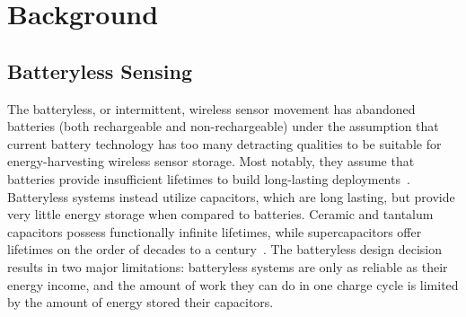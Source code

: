 \chapter{Background}


\section{Batteryless Sensing}

The batteryless, or intermittent, wireless sensor movement has abandoned batteries (both rechargeable and non-rechargeable) under the assumption that current battery technology has too many detracting qualities to be suitable for energy-harvesting wireless sensor storage.
Most notably, they assume that batteries provide insufficient lifetimes to build long-lasting deployments~\cite{hesterNew17, hesterTragedy15, hesterFlicker17, hesterTimely17, hester2017future, colinReconfigurable18, luciaIntermittent17, yervaGrafting12, majid2020continuous}.
Batteryless systems instead utilize capacitors, which are long lasting, but provide very little energy storage when compared to batteries. Ceramic and tantalum capacitors possess functionally infinite lifetimes, while supercapacitors offer lifetimes on the order of decades to a century~\cite{kemetLife}. 
The batteryless design decision results in two major limitations: batteryless systems are only as reliable as their energy income, and the amount of work they can do in one charge cycle is limited by the amount of energy stored their capacitors.

